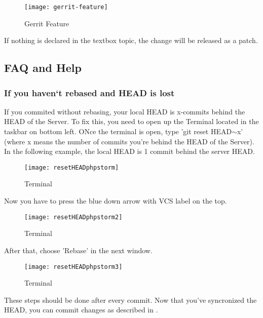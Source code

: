 \begin{figure}[H] 
	\centering
	\vspace{3pt}
	\texttt{[image: gerrit-feature]}
	\caption{Gerrit Feature}
\end{figure}

If nothing is declared in the textbox topic, the change will be released as a patch.

\newpage

\subsection{FAQ and Help}
\subsubsection{If you haven`t rebased and HEAD is lost}
If you commited without rebasing, your local HEAD is x-commits behind the HEAD of the Server. To fix this, you need to open up the Terminal located in the taskbar on bottom left. ONce the terminal is open, type 'git reset HEAD$\sim$x' (where x means the number of commits you're behind the HEAD of the Server). In the following example, the local HEAD is 1 commit behind the server HEAD.

\begin{figure}[H]
	\centering
	\vspace{1pt}
	\texttt{[image: resetHEADphpstorm]}
	\caption{Terminal}
\end{figure}

\noindent Now you have to press the blue down arrow with VCS label on the top.

\begin{figure}[H]
	\centering
	\vspace{1pt}
	\texttt{[image: resetHEADphpstorm2]}
	\caption{Terminal}
\end{figure}

\noindent After that, choose 'Rebase' in the next window.

\begin{figure}[H]
	\centering
	\vspace{1pt}
	\texttt{[image: resetHEADphpstorm3]}
	\caption{Terminal}
\end{figure}

\noindent These steps should be done after every commit. Now that you've syncronized the HEAD, you can commit changes as described in .


